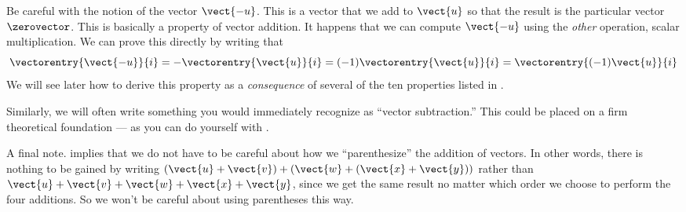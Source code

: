 %
Be careful with the notion of the vector $\vect{-u}$.  This is a vector that we add to $\vect{u}$ so that the result is the particular vector $\zerovector$.  This is basically a property of vector addition.  It happens that we can compute $\vect{-u}$ using the {\em other} operation, scalar multiplication.  We can prove this directly by writing that
%
\begin{equation*}
\vectorentry{\vect{-u}}{i}
=-\vectorentry{\vect{u}}{i}
=(-1)\vectorentry{\vect{u}}{i}
=\vectorentry{(-1)\vect{u}}{i}
\end{equation*}
%
We will see later how to derive this property as a {\em consequence} of several of the ten properties listed in .\par
%
Similarly, we will often write something you would immediately recognize as ``vector subtraction.''  This could be placed on a firm theoretical foundation --- as you can do yourself with .\par
%
A final note.   implies that we do not have to be careful about how we ``parenthesize'' the addition of vectors.  In other words, there is nothing to be gained by writing
$\left(\vect{u}+\vect{v}\right)+\left(\vect{w}+\left(\vect{x}+\vect{y}\right)\right)$
rather than
$\vect{u}+\vect{v}+\vect{w}+\vect{x}+\vect{y}$, since we get the same result no matter which order we choose to perform the four additions.  So we won't be careful about using parentheses this way.
%
%


